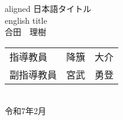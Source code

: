 \documentclass[a4paper]{ltjsbook}
\begin{document}
\begin{titlepage}
\Large
\begin{center}
\vspace*{80pt}aligned
    {\huge 日本語タイトル} \\
\vspace*{10mm}
    {\huge english title}
\vspace*{80mm} \\
合田　理樹

\vspace*{10mm}
\begin{tabular}{ll}
    指導教員 & 降籏　大介 \\
    副指導教員 & 宮武　勇登 \\
\end{tabular}
\vspace*{20mm} \\
令和7年2月 \\
\end{center}
\end{titlepage}

\tableofcontents

















\appendix



\end{document}
